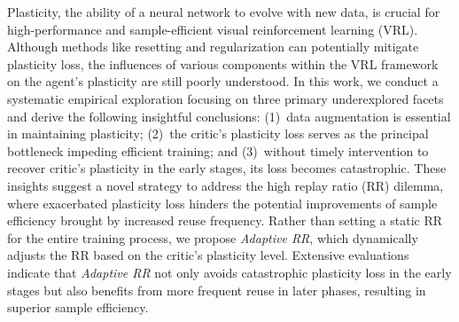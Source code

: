 Plasticity, the ability of a neural network to evolve with new data, is crucial for high-performance and sample-efficient visual reinforcement learning (VRL). Although methods like resetting and regularization can potentially mitigate plasticity loss, the influences of various components within the VRL framework on the agent's plasticity are still poorly understood. In this work, we conduct a systematic empirical exploration focusing on three primary underexplored facets and derive the following insightful conclusions: (1)~data augmentation is essential in maintaining plasticity; (2)~the critic's plasticity loss serves as the principal bottleneck impeding efficient training; and (3)~without timely intervention to recover critic's plasticity in the early stages, its loss becomes catastrophic.
These insights suggest a novel strategy to address the high replay ratio (RR) dilemma, where exacerbated plasticity loss hinders the potential improvements of sample efficiency brought by increased reuse frequency.
Rather than setting a static RR for the entire training process, we propose \textit{Adaptive RR}, which dynamically adjusts the RR based on the critic’s plasticity level.
Extensive evaluations indicate that \textit{Adaptive RR} not only avoids catastrophic plasticity loss in the early stages but also benefits from more frequent reuse in later phases, resulting in superior sample efficiency.

